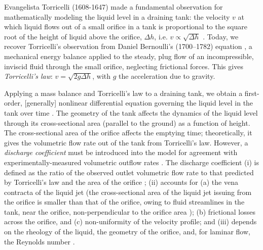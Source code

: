 \documentclass[openacc]{rsproca_new}%
\begin{document}

Evangelista Torricelli (1608-1647) made a fundamental observation for mathematically modeling the liquid level in a draining tank: the velocity $v$ at which liquid flows out of a small orifice in a tank is proportional to the square root of the height of liquid above the orifice, $\Delta h$, i.e. $v\propto \sqrt{\Delta h}$ \cite{mills1982newton}.
Today, we recover Torricelli's observation from Daniel Bernoulli's (1700–1782) equation \cite{welty2020fundamentals}, a mechanical energy balance applied to the steady, plug flow of an incompressible, inviscid fluid through the small orifice, neglecting frictional forces. This gives \emph{Torricelli's law}: $v=\sqrt{2 g \Delta h}$, with $g$ the acceleration due to gravity. \cite{d2021torricelli,teoman2022discharge}

Applying a mass balance and Torricelli's law to a draining tank, we obtain a first-order, [generally] nonlinear differential equation governing the liquid level in the tank over time \cite{groetsch1993inverse,seborg2016process,debook}.
The geometry of the tank affects the dynamics of the liquid level through its cross-sectional area (parallel to the ground) as a function of height.
The cross-sectional area of the orifice affects the emptying time; theoretically, it gives the volumetric flow rate out of the tank from Torricelli's law. 
However, a \emph{discharge coefficient} \cite{de2000pin,blasone2015discharge,wadhwa2021study,liu2008drainage} must be introduced into the model for agreement with experimentally-measured volumetric outflow rates \cite{farmer1992physical,driver1998torricelli,brady2009siphons,rother2024modelling,paldy1963apparatus,ivanov2014testing,williams2021vessel,pavesi2019investigating,planinvsivc2011holes,saleta2005experimental,lopac2015water,powell2012carrying}.
The discharge coefficient \cite{teoman2022discharge,hicks2014determining,blasone2015discharge,lienhard1984velocity,wadhwa2021study}
(i) is defined as the ratio of the observed outlet volumetric flow rate to that predicted by Torricelli's law and the area of the orifice \cite{hicks2014determining};
(ii) accounts for (a) the vena contracta of the liquid jet (the cross-sectional area of the liquid jet issuing from the orifice is smaller than that of the orifice, owing to fluid streamlines in the tank, near the orifice, non-perpendicular to the orifice area \cite{horsch2020simple}); (b) frictional losses across the orifice, and (c) non-uniformity of the velocity profile; and
(iii) depends on the rheology of the liquid, the geometry of the orifice, and, for laminar flow, the Reynolds number \cite{teoman2022discharge}. 
\end{document}
